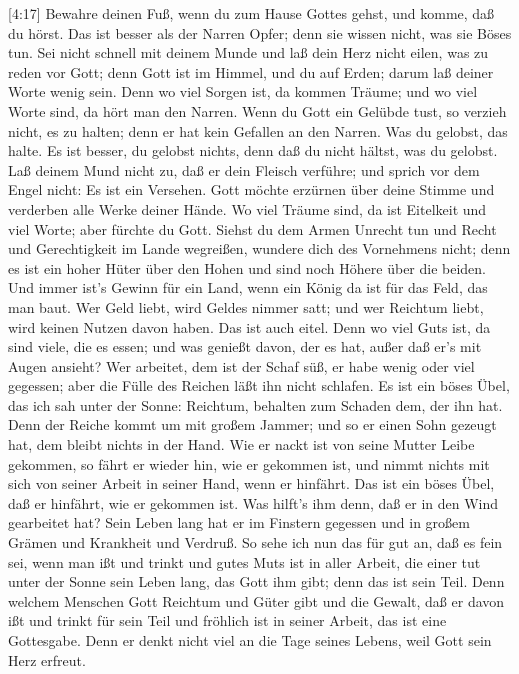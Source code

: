  {[}4:17{]} Bewahre deinen Fuß, wenn du zum Hause Gottes
gehst, und komme, daß du hörst. Das ist besser als der Narren Opfer;
denn sie wissen nicht, was sie Böses tun.  Sei nicht schnell
mit deinem Munde und laß dein Herz nicht eilen, was zu reden vor Gott;
denn Gott ist im Himmel, und du auf Erden; darum laß deiner Worte wenig
sein.  Denn wo viel Sorgen ist, da kommen Träume; und wo
viel Worte sind, da hört man den Narren.  Wenn du Gott ein
Gelübde tust, so verzieh nicht, es zu halten; denn er hat kein Gefallen
an den Narren. Was du gelobst, das halte.  Es ist besser, du
gelobst nichts, denn daß du nicht hältst, was du gelobst. 
Laß deinem Mund nicht zu, daß er dein Fleisch verführe; und sprich vor
dem Engel nicht: Es ist ein Versehen. Gott möchte erzürnen über deine
Stimme und verderben alle Werke deiner Hände.  Wo viel
Träume sind, da ist Eitelkeit und viel Worte; aber fürchte du Gott.
 Siehst du dem Armen Unrecht tun und Recht und Gerechtigkeit
im Lande wegreißen, wundere dich des Vornehmens nicht; denn es ist ein
hoher Hüter über den Hohen und sind noch Höhere über die beiden.
 Und immer ist's Gewinn für ein Land, wenn ein König da ist
für das Feld, das man baut.  Wer Geld liebt, wird Geldes
nimmer satt; und wer Reichtum liebt, wird keinen Nutzen davon haben. Das
ist auch eitel.  Denn wo viel Guts ist, da sind viele, die
es essen; und was genießt davon, der es hat, außer daß er's mit Augen
ansieht?  Wer arbeitet, dem ist der Schaf süß, er habe
wenig oder viel gegessen; aber die Fülle des Reichen läßt ihn nicht
schlafen.  Es ist ein böses Übel, das ich sah unter der
Sonne: Reichtum, behalten zum Schaden dem, der ihn hat. 
Denn der Reiche kommt um mit großem Jammer; und so er einen Sohn gezeugt
hat, dem bleibt nichts in der Hand.  Wie er nackt ist von
seine Mutter Leibe gekommen, so fährt er wieder hin, wie er gekommen
ist, und nimmt nichts mit sich von seiner Arbeit in seiner Hand, wenn er
hinfährt.  Das ist ein böses Übel, daß er hinfährt, wie er
gekommen ist. Was hilft's ihm denn, daß er in den Wind gearbeitet hat?
 Sein Leben lang hat er im Finstern gegessen und in großem
Grämen und Krankheit und Verdruß.  So sehe ich nun das für
gut an, daß es fein sei, wenn man ißt und trinkt und gutes Muts ist in
aller Arbeit, die einer tut unter der Sonne sein Leben lang, das Gott
ihm gibt; denn das ist sein Teil.  Denn welchem Menschen
Gott Reichtum und Güter gibt und die Gewalt, daß er davon ißt und trinkt
für sein Teil und fröhlich ist in seiner Arbeit, das ist eine
Gottesgabe.  Denn er denkt nicht viel an die Tage seines
Lebens, weil Gott sein Herz erfreut.

